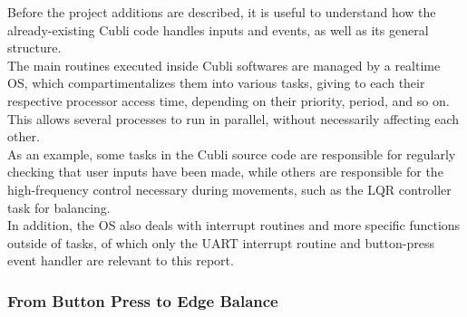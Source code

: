 Before the project additions are described, it is useful to understand how the already-existing Cubli code handles inputs and events, as well as its general structure.\\

The main routines executed inside Cubli softwares are managed by a realtime OS, which compartimentalizes them into various tasks, giving to each their respective processor access time, depending on their priority, period, and so on. This allows several processes to run in parallel, without necessarily affecting each other.\\

As an example, some tasks in the Cubli source code are responsible for regularly checking that user inputs have been made, while others are responsible for the high-frequency control necessary during movements, such as the LQR controller task for balancing.\\

In addition, the OS also deals with interrupt routines and more specific functions outside of tasks, of which only the UART interrupt routine and button-press event handler are relevant to this report.\\

\subsubsection{From Button Press to Edge Balance}

